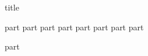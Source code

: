 \documentclass[paper=8.125in:10.250in,pagesize=pdftex,
    headinclude=false,footinclude=false,final,twoside,sfdefaults=false]{kaobook}
\begin{document}
    {title}
    \mainmatter

    {part}
    {part}
    {part}
    {part}
    {part}
    {part}
    {part}
    {part}


    \backmatter
    {part}
\end{document}

